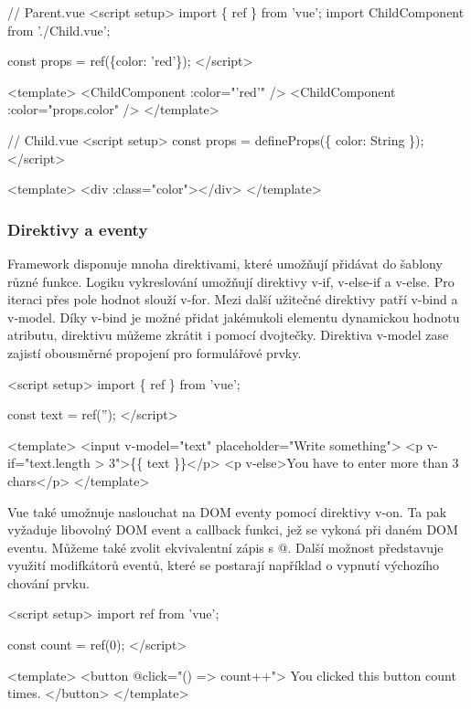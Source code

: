 \begin{prog}
// Parent.vue
<script setup>
  import \{ ref \} from 'vue';
  import ChildComponent from './Child.vue';

  const props = ref(\{color: 'red'\});
</script>

<template>
	<ChildComponent :color="'red'" />
  <ChildComponent :color="props.color" />
</template>

// Child.vue
<script setup>
  const props = defineProps(\{
    color: String
  \});
</script>

<template>
  <div :class="color"></div>
</template>
\end{prog}

\subsubsection{Direktivy a eventy}

Framework disponuje mnoha direktivami, které umožňují přidávat do šablony různé funkce. Logiku vykreslování umožňují direktivy v-if, v-else-if a v-else. 
Pro iteraci přes pole hodnot slouží v-for. Mezi další užitečné direktivy patří v-bind a v-model. 
Díky v-bind je možné přidat jakémukoli elementu dynamickou hodnotu atributu, direktivu můžeme zkrátit i pomocí dvojtečky. 
Direktiva v-model zase zajistí obousměrné propojení pro formulářové prvky.

\begin{prog}
<script setup>
  import \{ ref \} from 'vue';

  const text = ref('');
</script>

<template>
  <input v-model="text" placeholder="Write something">
  <p v-if="text.length > 3">\{\{ text \}\}</p>
  <p v-else>You have to enter more than 3 chars</p>
</template> 
\end{prog}

Vue také umožnuje naslouchat na DOM eventy pomocí direktivy v-on. Ta pak vyžaduje libovolný DOM event a callback funkci, jež se vykoná při daném DOM eventu. 
Můžeme také zvolit ekvivalentní zápis s @. Další možnost představuje využití modifkátorů eventů, které se postarají například o vypnutí výchozího chování prvku.\cite{vuemacrae,vue}

\begin{prog}
<script setup>
  import { ref } from 'vue';

  const count = ref(0);
</script>

<template>
  <button @click="() => count++">
    You clicked this button {{ count }} times.
  </button>
</template>
\end{prog}

